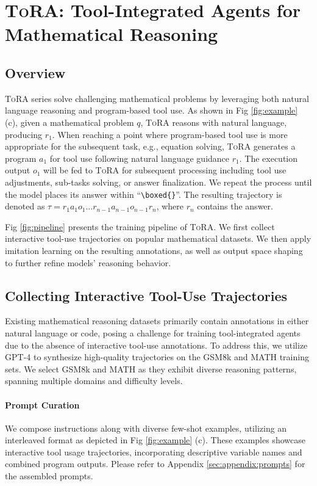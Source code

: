\section{\textsc{ToRA}: Tool-Integrated Agents for Mathematical Reasoning}

\subsection{Overview}
\textsc{ToRA} series solve challenging mathematical problems by leveraging both natural language reasoning and program-based tool use. As shown in Fig \ref{fig:example} (c), given a mathematical problem $q$, \textsc{ToRA} reasons with natural language, producing $r_1$. When reaching a point where program-based tool use is more appropriate for the subsequent task, e.g., equation solving, \textsc{ToRA} generates a program $a_1$ for tool use following natural language guidance $r_1$. The execution output $o_1$ will be fed to \textsc{ToRA} for subsequent processing including tool use adjustments, sub-tasks solving, or answer finalization. We repeat the process until the model places its answer within ``\lstinline|\boxed{}|''.
The resulting trajectory is denoted as $\tau=r_1 a_1 o_1 ... r_{n-1} a_{n-1} o_{n-1} r_{n}$, where $r_n$ contains the answer.

Fig \ref{fig:pipeline} presents the training pipeline of \textsc{ToRA}.
We first collect interactive tool-use trajectories on popular mathematical datasets. We then apply imitation learning on the resulting annotations, as well as output space shaping to further refine models' reasoning behavior.

\subsection{Collecting Interactive Tool-Use Trajectories}
\label{sec:method:data}

Existing mathematical reasoning datasets primarily contain annotations in either natural language or code, posing a challenge for training tool-integrated agents due to the absence of interactive tool-use annotations. To address this, we utilize GPT-4 to synthesize high-quality trajectories on the GSM8k and MATH training sets. We select GSM8k and MATH as they exhibit diverse reasoning patterns, spanning multiple domains and difficulty levels.

\paragraph{Prompt Curation} We compose instructions along with diverse few-shot examples, utilizing an interleaved format as depicted in Fig \ref{fig:example} (c). These examples showcase interactive tool usage trajectories, incorporating descriptive variable names and combined program outputs. Please refer to Appendix \ref{sec:appendix:prompts} for the assembled prompts.

